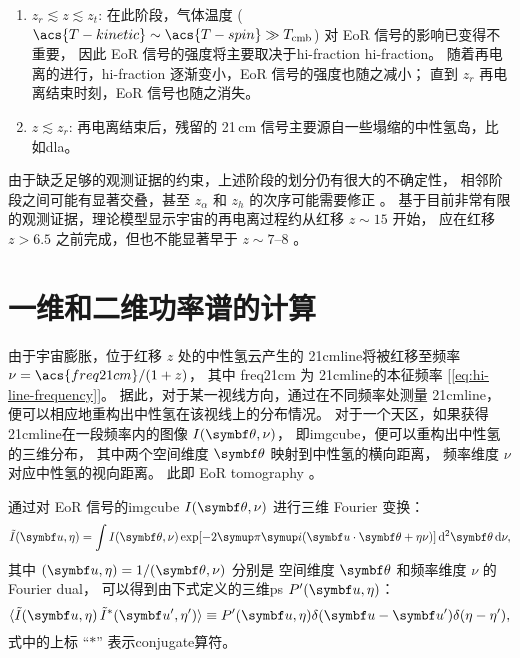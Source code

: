 \begin{enumerate}
  \item $z_r \lesssim z \lesssim z_t$:
    在此阶段，气体温度 ($\acs{T-kinetic} \sim \acs{T-spin} \gg T_{\R{cmb}}$)
    对 EoR 信号的影响已变得不重要，
    因此 EoR 信号的强度将主要取决于\acl{hi-fraction} \acs{hi-fraction}。
    随着再电离的进行，\acs{hi-fraction} 逐渐变小，EoR 信号的强度也随之减小；
    直到 $z_r$ 再电离结束时刻，EoR 信号也随之消失。

  \item $z \lesssim z_r$:
    再电离结束后，残留的 21\,cm 信号主要源自一些塌缩的中性氢岛，比如\ac{dla}。
\end{enumerate}

由于缺乏足够的观测证据的约束，上述阶段的划分仍有很大的不确定性，
相邻阶段之间可能有显著交叠，甚至 $z_{\alpha}$ 和 $z_h$ 的次序可能需要修正
\cite{nusser2005,pritchard2012}。
基于目前非常有限的观测证据，理论模型显示宇宙的再电离过程约从红移 $z \sim 15$ 开始，
应在红移 $z > 6.5$ 之前完成，但也不能显著早于 $z \sim \numrange{7}{8}$
\cite{choudhury2006,pritchard2010mn}。


\section{一维和二维功率谱的计算}
\label{sec:ps}

由于宇宙膨胀，位于红移 $z$ 处的中性氢云产生的 \ac{21cmline}将被红移至频率
$\nu = \acs{freq21cm} / (1 + z)$，
其中 \acs{freq21cm} 为 \ac{21cmline}的本征频率
[\autoref{eq:hi-line-frequency}]。
据此，对于某一视线方向，通过在不同频率处测量 \ac{21cmline}，
便可以相应地重构出中性氢在该视线上的分布情况。
对于一个天区，如果获得 \ac{21cmline}在一段频率内的图像 $I(\B{\theta},\nu)$，
即\ac{imgcube}，便可以重构出中性氢的三维分布，
其中两个空间维度 $\B{\theta}$ 映射到中性氢的横向距离，
频率维度 $\nu$ 对应中性氢的视向距离。
此即 EoR \acf{tomography} \cite{mellema2015}。

通过对 EoR 信号的\ac{imgcube} $I(\B{\theta},\nu)$ 进行三维 Fourier 变换：
\begin{equation}
  \label{eq:ft3d}
  \tilde{I}(\B{u}, \eta) =
    \int I(\B{\theta},\nu) \exp[ -2\Cpi\Ci (\B{u}\cdot\B{\theta} + \eta\nu) ]
    \,\mathrm{d}^2\B{\theta}\,\D{\nu} ,
\end{equation}
其中 $(\B{u}, \eta) = 1 / (\B{\theta}, \nu)$ 分别是
空间维度 $\B{\theta}$ 和频率维度 $\nu$ 的 Fourier \ac{dual}，
可以得到由下式定义的三维\ac{ps} $P'(\B{u}, \eta)$：
\begin{equation}
  \label{eq:ps3d}
  \langle \tilde{I}(\B{u}, \eta) \, \tilde{I}^*(\B{u}', \eta') \rangle
    \equiv P'(\B{u}, \eta) \delta(\B{u}-\B{u}') \delta(\eta-\eta') ,
\end{equation}
式中的上标 \enquote{$*$} 表示\ac{conjugate}算符。

